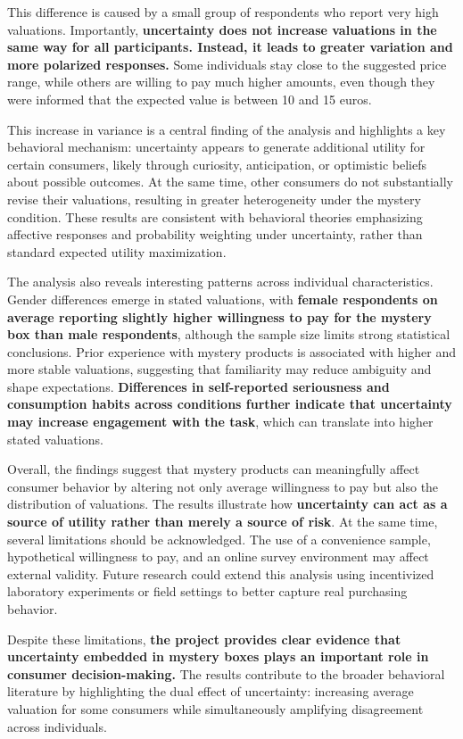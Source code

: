 \documentclass{article}
\begin{document}
This difference is caused by a small group of respondents who report very high valuations. Importantly, \textbf{uncertainty does not increase valuations in the same way for all participants. Instead, it leads to greater variation and more polarized responses.} Some individuals stay close to the suggested price range, while others are willing to pay much higher amounts, even though they were informed that the expected value is between 10 and 15 euros.

This increase in variance is a central finding of the analysis and highlights a key behavioral mechanism: uncertainty appears to generate additional utility for certain consumers, likely through curiosity, anticipation, or optimistic beliefs about possible outcomes. At the same time, other consumers do not substantially revise their valuations, resulting in greater heterogeneity under the mystery condition. These results are consistent with behavioral theories emphasizing affective responses and probability weighting under uncertainty, rather than standard expected utility maximization.

The analysis also reveals interesting patterns across individual characteristics. Gender differences emerge in stated valuations, with \textbf{female respondents on average reporting slightly higher willingness to pay for the mystery box than male respondents}, although the sample size limits strong statistical conclusions. Prior experience with mystery products is associated with higher and more stable valuations, suggesting that familiarity may reduce ambiguity and shape expectations.\textbf{ Differences in self-reported seriousness and consumption habits across conditions further indicate that uncertainty may increase engagement with the task}, which can translate into higher stated valuations.

Overall, the findings suggest that mystery products can meaningfully affect consumer behavior by altering not only average willingness to pay but also the distribution of valuations. The results illustrate how \textbf{uncertainty can act as a source of utility rather than merely a source of risk}. At the same time, several limitations should be acknowledged. The use of a convenience sample, hypothetical willingness to pay, and an online survey environment may affect external validity. Future research could extend this analysis using incentivized laboratory experiments or field settings to better capture real purchasing behavior.

Despite these limitations, \textbf{the project provides clear evidence that uncertainty embedded in mystery boxes plays an important role in consumer decision-making.} The results contribute to the broader behavioral literature by highlighting the dual effect of uncertainty: increasing average valuation for some consumers while simultaneously amplifying disagreement across individuals.
\end{document}
